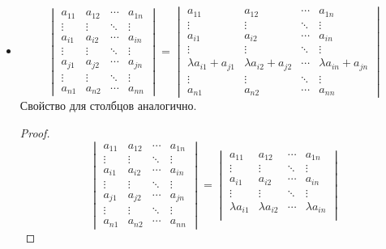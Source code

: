 \begin{itemize}
	\item \begin{equation*}
	\begin{vmatrix}
	a_{11} & a_{12} & \cdots & a_{1n} \\
	\vdots & \vdots & \ddots & \vdots \\
	a_{i1} & a_{i2} & \cdots & a_{in} \\
	\vdots & \vdots & \ddots & \vdots \\
	a_{j1} & a_{j2} & \cdots & a_{jn} \\
	\vdots & \vdots & \ddots & \vdots \\
	a_{n1} & a_{n2} & \cdots & a_{nn}
	\end{vmatrix} =
	\begin{vmatrix}
	a_{11} & a_{12} & \cdots & a_{1n} \\
	\vdots & \vdots & \ddots & \vdots \\
	a_{i1} & a_{i2} & \cdots & a_{in} \\
	\vdots & \vdots & \ddots & \vdots \\
	\lambda a_{i1} + a_{j1} & \lambda a_{i2} + a_{j2} & \cdots & \lambda a_{in} + a_{jn} \\
	\vdots & \vdots & \ddots & \vdots \\
	a_{n1} & a_{n2} & \cdots & a_{nn}
	\end{vmatrix}
	\end{equation*}
	Свойство для столбцов аналогично.
	\begin{proof}
	\begin{equation*}
	\begin{vmatrix}
	a_{11} & a_{12} & \cdots & a_{1n} \\
	\vdots & \vdots & \ddots & \vdots \\
	a_{i1} & a_{i2} & \cdots & a_{in} \\
	\vdots & \vdots & \ddots & \vdots \\
	a_{j1} & a_{j2} & \cdots & a_{jn} \\
	\vdots & \vdots & \ddots & \vdots \\
	a_{n1} & a_{n2} & \cdots & a_{nn}
	\end{vmatrix} =
	\begin{vmatrix}
	a_{11} & a_{12} & \cdots & a_{1n} \\
	\vdots & \vdots & \ddots & \vdots \\
	a_{i1} & a_{i2} & \cdots & a_{in} \\
	\vdots & \vdots & \ddots & \vdots \\
	\lambda a_{i1} & \lambda a_{i2} & \cdots & \lambda a_{in} \\

\end{vmatrix}
\end{equation*}
\end{proof}
\end{itemize}
